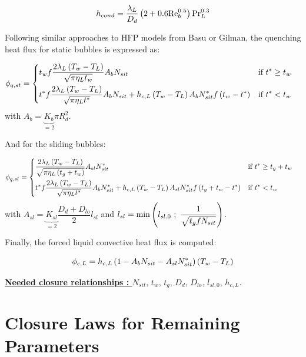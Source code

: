 \begin{equation}
h_{cond} = \frac{\lambda_{L}}{D_{d}}\left( 2+0.6\mathrm{Re}_{b}^{0.5} \right)\mathrm{Pr}_{L}^{0.3}
\end{equation}

Following similar approaches to HFP models from Basu or Gilman, the quenching heat flux for static bubbles is expressed as:

\begin{align}
\phi_{q,st}&=
\begin{dcases}
t_{w}f\frac{2\lambda_{L}\parth{T_{w}-T_{L}}}{\sqrt{\pi \eta_{L}t_{w}}}A_{b}N_{sit} & \text{if } t^{*} \geq t_{w}\\
%
t^{*}f\frac{2\lambda_{L}\parth{T_{w}-T_{L}}}{\sqrt{\pi \eta_{L}t^{*}}}A_{b}N_{sit} + h_{c,L}\parth{T_{w}-T_{L}}A_{b}N_{sit}^{*}f\parth{t_{w}-t^{*}} & \text{if } t^{*}<t_{w}
\end{dcases}
\end{align}
with $A_{b}= \underbrace{K_{b}}_{=2} \pi R_{d}^{2}$.

And for the sliding bubbles:

\begin{align}
\phi_{q,sl}&=
\begin{dcases}
\frac{2\lambda_{L}\parth{T_{w}-T_{L}}}{\sqrt{\pi \eta_{L}\parth{t_{g}+t_{w}}}}A_{sl}N_{sit}^{*} & \text{if } t^{*} \geq t_{g}+t_{w}\\
%
t^{*}f \frac{2\lambda_{L}\parth{T_{w}-T_{L}}}{\sqrt{\pi \eta_{L}t^{*}}}A_{b}N_{sit}^{*} + h_{c,L}\parth{T_{w}-T_{L}}A_{sl}N_{sit}^{*}f\parth{t_{g}+t_{w}-t^{*}} & \text{if } t^{*}<t_{w}
\end{dcases}
\end{align}
with $A_{sl}=\underbrace{K_{sl}}_{=2}\dfrac{D_{d}+D_{lo}}{2}l_{sl}$ and $l_{sl}=\mathrm{min}\left( l_{sl,0}\ ;\ \dfrac{1}{\sqrt{t_{g}fN_{sit}}}  \right)$.

Finally, the forced liquid convective heat flux is computed:

\begin{equation}
\phi_{c,L} = h_{c,L}\left( 1-A_{b}N_{sit}-A_{sl}N_{sit}^{*} \right)\left( T_{w}-T_{L} \right)
\end{equation}

\npar

\textbf{\underline{Needed closure relationships : }} $N_{sit}$, $t_{w}$, $t_{g}$, $D_{d}$, $D_{lo}$, $l_{sl,0}$, $h_{c,L}$. 


\section{Closure Laws for Remaining Parameters}

